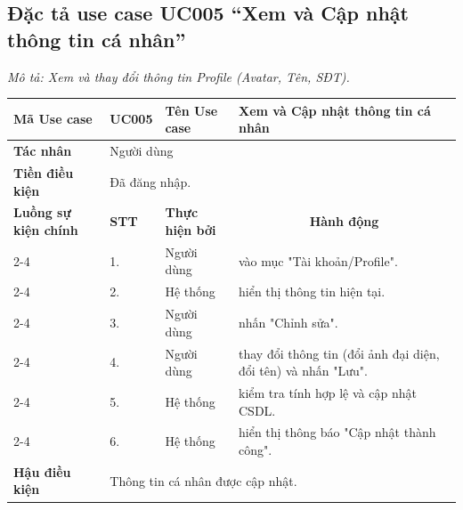 \documentclass[../main.tex]{subfiles}
\begin{document}
\subsection{Đặc tả use case UC005 ``Xem và Cập nhật thông tin cá nhân''}
\textit{Mô tả: Xem và thay đổi thông tin Profile (Avatar, Tên, SĐT).}
\vspace{0.5cm}

\begingroup
\renewcommand{\arraystretch}{1.5}

\begin{longtable}{|p{2.7cm}|p{0.8cm}|p{2.6cm}|p{7.3cm}|}
\hline
\cellcolor[HTML]{D5F5E3}\textbf{Mã Use case} & \multicolumn{1}{l|}{UC005} & \cellcolor[HTML]{D5F5E3}\textbf{Tên Use case} & Xem và Cập nhật thông tin cá nhân \\ \hline
\cellcolor[HTML]{D5F5E3}\textbf{Tác nhân} & \multicolumn{3}{p{10.7cm}|}{Người dùng} \\ \hline
\cellcolor[HTML]{D5F5E3}\textbf{Tiền điều kiện} & \multicolumn{3}{p{10.7cm}|}{Đã đăng nhập.} \\ \hline

\cellcolor[HTML]{D5F5E3}\textbf{Luồng sự kiện chính} & \cellcolor[HTML]{FDEBD0}\textbf{STT} & \cellcolor[HTML]{FDEBD0}\textbf{Thực hiện bởi} & \multicolumn{1}{c|}{\cellcolor[HTML]{FDEBD0}\textbf{Hành động}} \\ \cline{2-4} 
\cellcolor[HTML]{D5F5E3} & 1. & Người dùng & vào mục "Tài khoản/Profile". \\ \cline{2-4} 
\cellcolor[HTML]{D5F5E3} & 2. & Hệ thống & hiển thị thông tin hiện tại. \\ \cline{2-4} 
\cellcolor[HTML]{D5F5E3} & 3. & Người dùng & nhấn "Chỉnh sửa". \\ \cline{2-4} 
\cellcolor[HTML]{D5F5E3} & 4. & Người dùng & thay đổi thông tin (đổi ảnh đại diện, đổi tên) và nhấn "Lưu". \\ \cline{2-4} 
\cellcolor[HTML]{D5F5E3} & 5. & Hệ thống & kiểm tra tính hợp lệ và cập nhật CSDL. \\ \cline{2-4} 
\cellcolor[HTML]{D5F5E3} & 6. & Hệ thống & hiển thị thông báo "Cập nhật thành công". \\ \hline

\cellcolor[HTML]{D5F5E3}\textbf{Hậu điều kiện} & \multicolumn{3}{p{10.7cm}|}{Thông tin cá nhân được cập nhật.} \\ \hline
\end{longtable}
\endgroup
\end{document}
